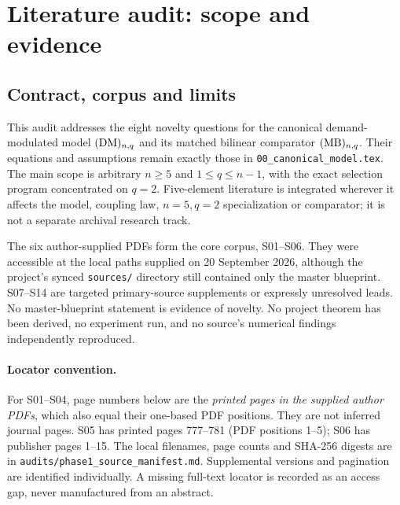 \section{Literature audit: scope and evidence}
\label{sec:phase1-audit}

\subsection{Contract, corpus and limits}
This audit addresses the eight novelty questions for the canonical
demand-modulated model $(\mathrm{DM})_{n,q}$ and its matched bilinear comparator
$(\mathrm{MB})_{n,q}$. Their equations and assumptions remain exactly those in
\texttt{00\_canonical\_model.tex}. The main scope is arbitrary $n\geq5$ and
$1\leq q\leq n-1$, with the exact selection program concentrated on $q=2$.
Five-element literature is integrated wherever it affects the model,
coupling law, $n=5,q=2$ specialization or comparator; it is not a separate
archival research track.

The six author-supplied PDFs form the core corpus, S01--S06. They were
accessible at the local paths supplied on 20 September 2026, although the
project's synced \texttt{sources/} directory still contained only the master
blueprint. S07--S14 are targeted primary-source supplements or expressly
unresolved leads. No master-blueprint statement is evidence of novelty.
No project theorem has been derived, no experiment run, and no source's
numerical findings independently reproduced.

\paragraph{Locator convention.}
For S01--S04, page numbers below are the \emph{printed pages in the supplied
author PDFs}, which also equal their one-based PDF positions. They are not
inferred journal pages. S05 has printed pages 777--781 (PDF positions 1--5);
S06 has publisher pages 1--15. The local filenames, page counts and SHA-256
digests are in \texttt{audits/phase1\_source\_manifest.md}. Supplemental
versions and pagination are identified individually. A missing full-text
locator is recorded as an access gap, never manufactured from an abstract.

